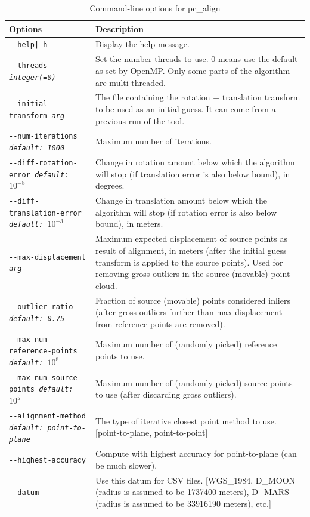 \begin{longtable}{|p{8cm}|p{9cm}|}
\caption{Command-line options for pc\_align}
\label{tbl:pcalign}
\endfirsthead
\endhead
\endfoot
\endlastfoot
\hline
Options & Description \\ \hline \hline
\texttt{-\/-help|-h} & Display the help message.\\ \hline
\texttt{-\/-threads \textit{integer(=0)}} & Set the number threads to
use. 0 means use the default as set by OpenMP. Only some parts of the algorithm are multi-threaded.\\ \hline
\texttt{-\/-initial-transform \textit{arg}} &
The file containing the rotation + translation transform to be used as an
initial guess. It can come from a previous run of the tool. \\ \hline
\texttt{-\/-num-iterations \textit{default: 1000}} &  Maximum number of iterations. \\ \hline
\texttt{-\/-diff-rotation-error \textit{default: $10^{-8}$}} & Change in rotation amount below which the algorithm will stop (if translation error is also below bound), in degrees. \\ \hline
\texttt{-\/-diff-translation-error \textit{default: $10^{-3}$}} & Change in translation amount below which the algorithm will stop (if rotation error is also below bound), in meters. \\ \hline
\texttt{-\/-max-displacement \textit{arg}} & Maximum expected
displacement of source points as result of alignment, in meters (after
the initial guess transform is applied to the source points). Used
for removing gross outliers in the source (movable) point cloud.\\ \hline
\texttt{-\/-outlier-ratio \textit{default: 0.75}} &  Fraction of source (movable) points considered inliers (after gross outliers further than max-displacement from reference points are removed). \\ \hline
\texttt{-\/-max-num-reference-points \textit{default: $10^8$}} &
Maximum number of (randomly picked) reference points to use. \\ \hline
\texttt{-\/-max-num-source-points \textit{default: $10^5$}} & Maximum number of (randomly picked) source points to use (after discarding gross outliers). \\ \hline
\texttt{-\/-alignment-method \textit{default: point-to-plane}} & The type of iterative closest point
method to use. [point-to-plane, point-to-point]\\ \hline
\texttt{-\/-highest-accuracy} & Compute with highest accuracy for point-to-plane (can be much slower). \\ \hline
\texttt{-\/-datum \textit{}} & Use this datum for CSV files. [WGS\_1984, D\_MOON (radius is assumed to be 1737400 meters), D\_MARS (radius is assumed to be 33916190 meters), etc.] \\ \hline



\end{longtable}
